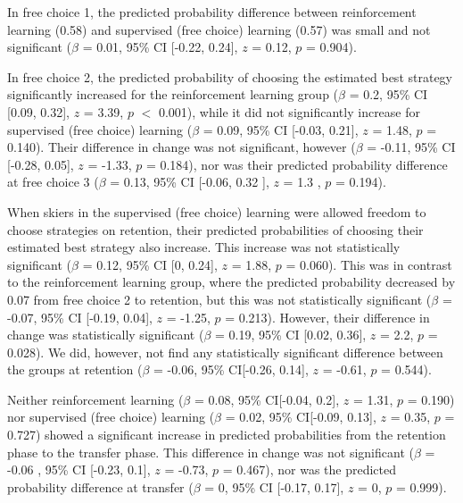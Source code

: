 \documentclass{article}
\begin{document}
In free choice 1, the predicted probability difference between reinforcement learning (0.58) and supervised (free choice) learning (0.57) was small and not significant ($\beta$ = 0.01, 95\% CI [-0.22, 0.24], $z$ = 0.12, $p$ = 0.904). 

In free choice 2, the predicted probability of choosing the estimated best strategy significantly increased for the reinforcement learning group ($\beta$ = 0.2, 95\% CI [0.09, 0.32], $z$ = 3.39, $p$  $<$ 0.001), while it did not significantly increase for supervised (free choice) learning ($\beta$ = 0.09, 95\% CI [-0.03, 0.21], $z$ = 1.48, $p$ = 0.140). Their difference in change was not significant, however ($\beta$ = -0.11, 95\% CI [-0.28, 0.05], $z$ = -1.33, $p$ = 0.184), nor was their predicted probability difference at free choice 3 ($\beta$ = 0.13, 95\% CI [-0.06, 0.32 ], $z$ = 1.3 , $p$  =  0.194).

When skiers in the supervised (free choice) learning were allowed freedom to choose strategies on retention, their predicted probabilities of choosing their estimated best strategy also increase. This increase was not statistically significant ($\beta$ = 0.12, 95\% CI [0, 0.24], $z$ = 1.88, $p$ = 0.060). This was in contrast to the reinforcement learning group, where the predicted probability decreased by 0.07 from free choice 2 to retention, but this was not statistically significant ($\beta$ = -0.07, 95\% CI [-0.19, 0.04], $z$ = -1.25, $p$ = 0.213). However, their difference in change was statistically significant ($\beta$ = 0.19, 95\% CI [0.02, 0.36], $z$ = 2.2, $p$ = 0.028). We did, however,  not find any statistically significant difference between the groups at retention ($\beta$ = -0.06, 95\% CI[-0.26, 0.14], $z$ = -0.61, $p$ = 0.544).

Neither reinforcement learning ($\beta$ = 0.08, 95\% CI[-0.04, 0.2], $z$ = 1.31, $p$ = 0.190) nor supervised (free choice) learning ($\beta$ = 0.02, 95\% CI[-0.09, 0.13], $z$ = 0.35, $p$ = 0.727) showed a significant increase in predicted probabilities from the retention phase to the transfer phase. This difference in change was not significant ($\beta$ = -0.06 , 95\% CI [-0.23, 0.1], $z$ = -0.73, $p$ = 0.467), nor was the predicted probability difference at transfer ($\beta$ = 0, 95\% CI [-0.17, 0.17], $z$ = 0, $p$ = 0.999).
\end{document}
